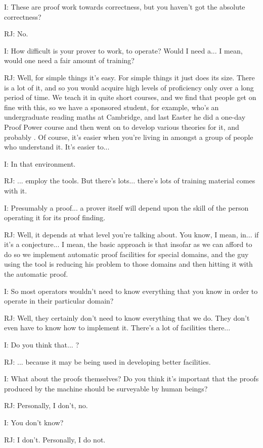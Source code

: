 \documentclass[10pt,titlepage]{book}
\begin{document}
I: These are proof work towards correctness, but you haven't got the absolute correctness?

RJ: No.

I: How difficult is your prover to work, to operate? Would I need a... I mean, would one need a fair amount of training?

RJ: Well, for simple things it's easy. For simple things it just does its 	size. There is a lot of it, and so you would acquire high levels of proficiency only over a long period of time. We teach it in quite short courses, and we find that people get on fine with this, so we have a sponsored student, for example, who's an undergraduate reading maths at Cambridge, and last Easter he did a one-day Proof Power course and then went on to develop various theories for it, and probably 	. Of course, it's easier when you're living in amongst a group of people who understand it. It's easier to...

I: In that environment.

RJ: ... employ the tools. But there's lots... there's lots of training material comes with it.

I: Presumably a proof... a prover itself will depend upon the skill of the person operating it for its proof finding.

RJ: Well, it depends at what level you're talking about. You know, I mean, in... if it's a conjecture... I mean, the basic approach is that insofar as we can afford to do so we implement automatic proof facilities for special domains, and the guy using the tool is reducing his problem to those domains and then hitting it with the automatic proof.

I: So most operators wouldn't need to know everything that you know in order to operate in their particular domain?

RJ: Well, they certainly don't need to know everything that we do. They don't even have to know how to implement it. There's a lot of facilities there...

I: Do you think that... ?

RJ: ... because it may be being used in developing better facilities.

I: What about the proofs themselves? Do you think it's important that the proofs produced by the machine should be surveyable by human beings?

RJ: Personally, I don't, no.

I: You don't know?

RJ: I don't. Personally, I do not.
\end{document}
